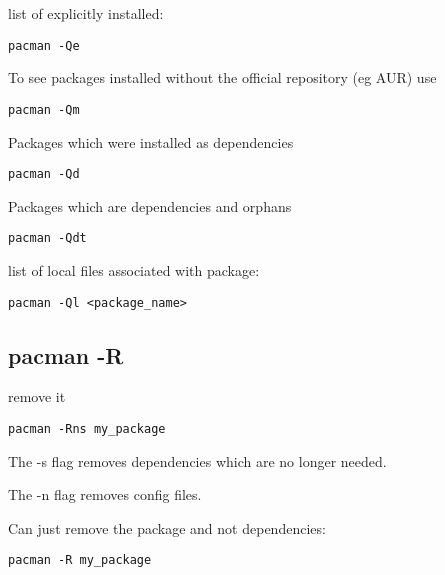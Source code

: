list of explicitly installed:
\begin{verbatim}
pacman -Qe
\end{verbatim}
To see packages installed without the official repository (eg AUR) use
\begin{verbatim}
pacman -Qm
\end{verbatim}

Packages which were installed as dependencies
\begin{verbatim}
pacman -Qd
\end{verbatim}

Packages which are dependencies and orphans
\begin{verbatim}
pacman -Qdt
\end{verbatim}

list of local files associated with package:
\begin{verbatim}
pacman -Ql <package_name>
\end{verbatim}




\subsection{pacman -R}
remove it
\begin{verbatim}
pacman -Rns my_package
\end{verbatim}

The -s flag removes dependencies which are no longer needed.

The -n flag removes config files.

Can just remove the package and not dependencies:

\begin{verbatim}
pacman -R my_package
\end{verbatim}


